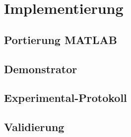 %
%
\chapter{Implementierung}\label{ch:implementierung}
\section{Portierung MATLAB}
\section{Demonstrator}
\section{Experimental-Protokoll }
\section{Validierung}